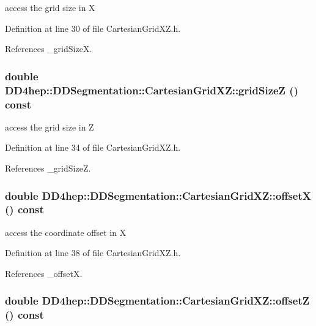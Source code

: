 access the grid size in X 

Definition at line 30 of file CartesianGridXZ.h.

References \_\-gridSizeX.\hypertarget{class_d_d4hep_1_1_d_d_segmentation_1_1_cartesian_grid_x_z_a03673d1debc555efed18d828d269c935}{
\subsubsection[{gridSizeZ}]{\setlength{\rightskip}{0pt plus 5cm}double DD4hep::DDSegmentation::CartesianGridXZ::gridSizeZ () const}}
\label{class_d_d4hep_1_1_d_d_segmentation_1_1_cartesian_grid_x_z_a03673d1debc555efed18d828d269c935}


access the grid size in Z 

Definition at line 34 of file CartesianGridXZ.h.

References \_\-gridSizeZ.\hypertarget{class_d_d4hep_1_1_d_d_segmentation_1_1_cartesian_grid_x_z_adc83460c3aa0d1bd311f758ee09987cb}{
\subsubsection[{offsetX}]{\setlength{\rightskip}{0pt plus 5cm}double DD4hep::DDSegmentation::CartesianGridXZ::offsetX () const}}
\label{class_d_d4hep_1_1_d_d_segmentation_1_1_cartesian_grid_x_z_adc83460c3aa0d1bd311f758ee09987cb}


access the coordinate offset in X 

Definition at line 38 of file CartesianGridXZ.h.

References \_\-offsetX.\hypertarget{class_d_d4hep_1_1_d_d_segmentation_1_1_cartesian_grid_x_z_a0ac0582e3c6952e32a42f6fc461a7437}{
\subsubsection[{offsetZ}]{\setlength{\rightskip}{0pt plus 5cm}double DD4hep::DDSegmentation::CartesianGridXZ::offsetZ () const}}
\label{class_d_d4hep_1_1_d_d_segmentation_1_1_cartesian_grid_x_z_a0ac0582e3c6952e32a42f6fc461a7437}


